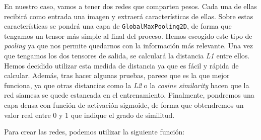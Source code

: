 \documentclass[11pt,a4paper]{article}
\begin{document}
En nuestro caso, vamos a tener dos redes que comparten pesos. Cada una de ellas recibirá como entrada
una imagen y extraerá características de ellas. Sobre estas características se pondrá una capa de
\texttt{GlobalMaxPooling2D}, de forma que tengamos un tensor más simple al final del proceso. Hemos escogido
este tipo de \textit{pooling} ya que nos permite quedarnos con la información más relevante. Una vez que tengamos
los dos tensores de salida, se calculará la distancia \textit{L1} entre ellos. Hemos decidido utilizar esta medida
de distancia ya que es fácil y rápida de calcular. Además, tras hacer algunas pruebas, parece que es la que mejor
funciona, ya que otras distancias como la \textit{L2} o la \textit{cosine similarity} hacen que la red siamesa se
quede estancada en el entrenamiento. Finalmente, pondremos una capa densa con función de activación sigmoide,
de forma que obtendremos un valor real entre 0 y 1 que indique el grado de similitud.

Para crear las redes, podemos utilizar la siguiente función:
\end{document}
